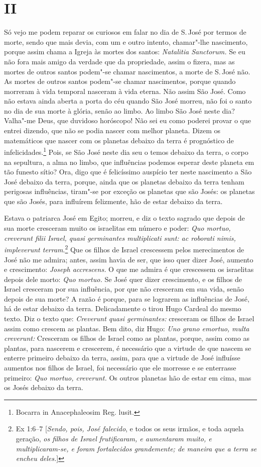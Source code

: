 \section*{II}

Só vejo me podem reparar os curiosos em falar no dia de S.\,José por
termos de morte, sendo que mais devia, com um e outro intento,
chamar"-lhe nascimento, porque assim chama a Igreja às mortes dos santos:
\emph{Natalitia Sanctorum.} Se eu não fora mais amigo da verdade que
da propriedade, assim o fizera, mas as mortes de outros santos podem"-se
chamar nascimentos, a morte de S.\,José não. As mortes de outros santos
podem"-se chamar nascimentos, porque quando morreram à vida temporal nasceram à
vida eterna. Não assim São José. Como não estava ainda aberta a porta do
céu quando São José morreu, não foi o santo no dia de sua morte à
glória, senão ao limbo. Ao limbo São José neste dia? Valha"-me Deus, que
duvidoso horóscopo! Não sei eu como poderei provar o que entrei dizendo,
que não se podia nascer com melhor planeta. Dizem os matemáticos que nascer com
os planetas debaixo da terra é prognóstico de infelicidades.\footnote{Bocarra in Anacephaleosim Reg. lusit.}
Pois, se São José neste dia seu o temos debaixo da terra, o
corpo na sepultura, a alma no limbo, que influências podemos esperar
deste planeta em tão funesto sítio? Ora, digo que é felicíssimo auspício
ter neste nascimento a São José debaixo da terra, porque, ainda que os
planetas debaixo da terra tenham perigosas influências, tiram"-se por
exceção os planetas que são Josés: os planetas que são Josés, para
influírem felizmente, hão de estar debaixo da terra.

Estava o patriarca José em Egito; morreu, e diz o texto sagrado que
depois de sua morte cresceram muito os israelitas em número e poder:
\emph{Quo mortuo, creverunt filii Israel, quasi germinantes multiplicati
sunt: ac roborati nimis, impleverunt terram}.\footnote{Ex 1:6--7 [\textit{Sendo, pois, José falecido}, e todos os seus irmãos, e toda aquela geração, \textit{os filhos de Israel frutificaram, e aumentaram muito, e multiplicaram-se, e foram fortalecidos grandemente; de maneira que a terra se encheu deles.}]} Que os filhos de
Israel crescessem pelos merecimentos de José não me admira; antes, assim
havia de ser, que isso quer dizer José, aumento e crescimento:
\emph{Joseph accrescens.} O que me admira é que crescessem os
israelitas depois dele morto: \emph{Quo mortuo.} Se José quer dizer
crescimento, e os filhos de Israel cresceram por sua influência, por que
não cresceram em sua vida, senão depois de sua morte? A razão é porque,
para se lograrem as influências de José, há de estar debaixo da terra.
Delicadamente o tirou Hugo Cardeal do mesmo texto. Diz o texto que:
\emph{Creverunt quasi germinantes:} cresceram os filhos de Israel assim
como crescem as plantas. Bem dito, diz Hugo: \emph{Uno grano emortuo,
multa creverunt:} Cresceram os filhos de Israel como as plantas, porque,
assim como as plantas, para nascerem e crescerem, é necessário que a
virtude de que nascem se enterre primeiro debaixo da terra, assim, para
que a virtude de José influísse aumentos nos filhos de Israel, foi
necessário que ele morresse e se enterrasse primeiro: \emph{Quo mortuo,
creverunt.} Os outros planetas hão de estar em cima, mas os Josés
debaixo da terra.


